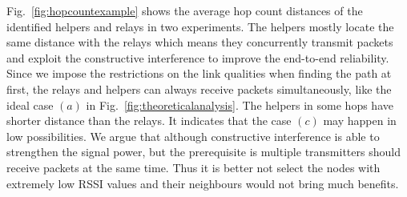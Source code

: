 \documentclass[conference]{IEEEtran}
\begin{document}

Fig.~\ref{fig:hopcountexample} shows the average hop count distances of the identified helpers and relays in two experiments. The helpers mostly locate the same distance with the relays which means they concurrently transmit packets and exploit the constructive interference to improve the end-to-end reliability. Since we impose the restrictions on the link qualities when finding the path at first, the relays and helpers can always receive packets simultaneously, like the ideal case $(a)$ in Fig.~\ref{fig:theoreticalanalysis}. The helpers in some hops have shorter distance than the relays. It indicates that the case $(c)$ may happen in low possibilities. We argue that although constructive interference is able to strengthen the signal power, but the prerequisite is multiple transmitters should receive packets at the same time. Thus it is better not select the nodes with extremely low RSSI values and their neighbours would not bring much benefits. 
\end{document}

